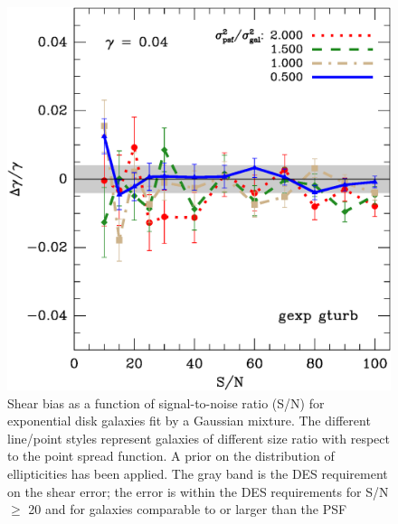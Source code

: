 \documentclass[12pt]{article}
\begin{document}
\begin{figure}[p]
\centering

\includegraphics[scale=0.4]{mcbayes-get01r05r06r07r08-yr-0.050-0.050-frac.eps}
\caption{Shear bias as a function of signal-to-noise ratio (S/N) for exponential disk
galaxies fit by a Gaussian mixture.  The different line/point styles represent
galaxies of different size ratio with respect to the point spread function.
A prior on the distribution of ellipticities has been applied.
The gray band is the DES requirement on the shear error; the error is within
the DES requirements for S/N $\geq$ 20 and for galaxies comparable to
or larger than the PSF\label{fig:get}}


\end{figure}
\end{document}
